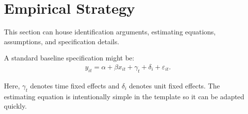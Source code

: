 \section{Empirical Strategy}

This section can house identification arguments, estimating equations, assumptions, and specification details.

A standard baseline specification might be:
\begin{align}
  y_{it} = \alpha + \beta x_{it} + \gamma_t + \delta_i + \varepsilon_{it}.
\end{align}

Here, $\gamma_t$ denotes time fixed effects and $\delta_i$ denotes unit fixed effects. The estimating equation is intentionally simple in the template so it can be adapted quickly.
